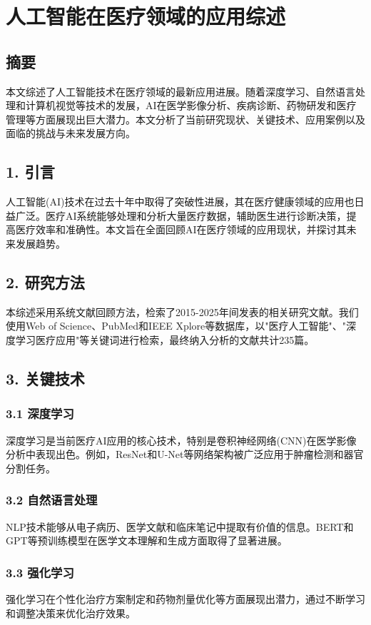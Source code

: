 

\section{人工智能在医疗领域的应用综述}
\subsection{摘要}
本文综述了人工智能技术在医疗领域的最新应用进展。随着深度学习、自然语言处理和计算机视觉等技术的发展，AI在医学影像分析、疾病诊断、药物研发和医疗管理等方面展现出巨大潜力。本文分析了当前研究现状、关键技术、应用案例以及面临的挑战与未来发展方向。

\subsection{1. 引言}
人工智能(AI)技术在过去十年中取得了突破性进展，其在医疗健康领域的应用也日益广泛。医疗AI系统能够处理和分析大量医疗数据，辅助医生进行诊断决策，提高医疗效率和准确性。本文旨在全面回顾AI在医疗领域的应用现状，并探讨其未来发展趋势。

\subsection{2. 研究方法}
本综述采用系统文献回顾方法，检索了2015-2025年间发表的相关研究文献。我们使用Web of Science、PubMed和IEEE Xplore等数据库，以"医疗人工智能"、"深度学习医疗应用"等关键词进行检索，最终纳入分析的文献共计235篇。

\subsection{3. 关键技术}
\subsubsection{3.1 深度学习}
深度学习是当前医疗AI应用的核心技术，特别是卷积神经网络(CNN)在医学影像分析中表现出色。例如，ResNet和U-Net等网络架构被广泛应用于肿瘤检测和器官分割任务。

\subsubsection{3.2 自然语言处理}
NLP技术能够从电子病历、医学文献和临床笔记中提取有价值的信息。BERT和GPT等预训练模型在医学文本理解和生成方面取得了显著进展。

\subsubsection{3.3 强化学习}
强化学习在个性化治疗方案制定和药物剂量优化等方面展现出潜力，通过不断学习和调整决策来优化治疗效果。

